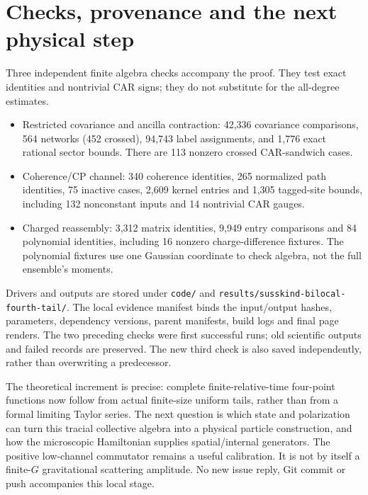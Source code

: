 \documentclass[11pt]{article}
\begin{document}
\section{Checks, provenance and the next physical step}
Three independent finite algebra checks accompany the proof. They
test exact identities and nontrivial CAR signs; they do not substitute
for the all-degree estimates.
\begin{itemize}
\item Restricted covariance and ancilla contraction:
42,336 covariance comparisons, 564 networks (452 crossed),
94,743 label assignments, and 1,776 exact rational sector bounds.
There are 113 nonzero crossed CAR-sandwich cases.
\item Coherence/CP channel:
340 coherence identities, 265 normalized path identities,
75 inactive cases, 2,609 kernel entries and 1,305 tagged-site bounds,
including 132 nonconstant inputs and 14 nontrivial CAR gauges.
\item Charged reassembly: 3,312 matrix identities, 9,949 entry
comparisons and 84 polynomial identities, including 16 nonzero
charge-difference fixtures. The polynomial fixtures use one Gaussian
coordinate to check algebra, not the full ensemble's moments.
\end{itemize}
Drivers and outputs are stored under \texttt{code/} and
\texttt{results/susskind-bilocal-fourth-tail/}. The local evidence
manifest binds the input/output hashes, parameters, dependency
versions, parent manifests, build logs and final page renders.
The two preceding checks were first successful runs; old scientific
outputs and failed records are preserved. The new third check is
also saved independently, rather than overwriting a predecessor.

The theoretical increment is precise: complete finite-relative-time
four-point functions now follow from actual finite-size uniform
tails, rather than from a formal limiting Taylor series. The next
question is which state and polarization can turn this tracial
collective algebra into a physical particle construction, and how
the microscopic Hamiltonian supplies spatial/internal generators.
The positive low-channel commutator remains a useful calibration.
It is not by itself a finite-$G$ gravitational scattering amplitude.
No new issue reply, Git commit or push accompanies this local stage.
\end{document}
